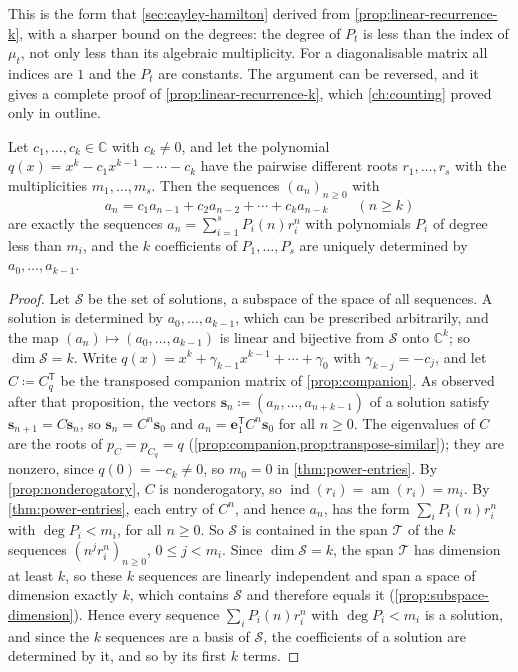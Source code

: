 This is the form that \cref{sec:cayley-hamilton} derived from \cref{prop:linear-recurrence-k}, with a sharper bound on the degrees: the degree of $P_t$ is less than the index of $\mu_t$, not only less than its algebraic multiplicity. For a diagonalisable matrix all indices are $1$ and the $P_t$ are constants. The argument can be reversed, and it gives a complete proof of \cref{prop:linear-recurrence-k}, which \cref{ch:counting} proved only in outline.

\begin{corollary}
\label{cor:linear-recurrence}
Let $c_1,\ldots,c_k\in\mathbb C$ with $c_k\ne0$, and let the polynomial $q(x)=x^k-c_1x^{k-1}-\cdots-c_k$ have the pairwise different roots $r_1,\ldots,r_s$ with the multiplicities $m_1,\ldots,m_s$. Then the sequences $(a_n)_{n\ge0}$ with
\[
a_n=c_1a_{n-1}+c_2a_{n-2}+\cdots+c_ka_{n-k}\qquad(n\ge k)
\]
are exactly the sequences $a_n=\sum_{i=1}^sP_i(n)r_i^n$ with polynomials $P_i$ of degree less than $m_i$, and the $k$ coefficients of $P_1,\ldots,P_s$ are uniquely determined by $a_0,\ldots,a_{k-1}$.
\end{corollary}

\begin{proof}
Let $\mathcal S$ be the set of solutions, a subspace of the space of all sequences. A solution is determined by $a_0,\ldots,a_{k-1}$, which can be prescribed arbitrarily, and the map $(a_n)\mapsto(a_0,\ldots,a_{k-1})$ is linear and bijective from $\mathcal S$ onto $\mathbb C^k$; so $\dim\mathcal S=k$. Write $q(x)=x^k+\gamma_{k-1}x^{k-1}+\cdots+\gamma_0$ with $\gamma_{k-j}=-c_j$, and let $C\coloneqq C_q^{\mathsf T}$ be the transposed companion matrix of \cref{prop:companion}. As observed after that proposition, the vectors $\mathbf s_n\coloneqq(a_n,\ldots,a_{n+k-1})$ of a solution satisfy $\mathbf s_{n+1}=C\mathbf s_n$, so $\mathbf s_n=C^n\mathbf s_0$ and $a_n=\mathbf e_1^{\mathsf T}C^n\mathbf s_0$ for all $n\ge0$. The eigenvalues of $C$ are the roots of $p_C=p_{C_q}=q$ (\cref{prop:companion,prop:transpose-similar}); they are nonzero, since $q(0)=-c_k\ne0$, so $m_0=0$ in \cref{thm:power-entries}. By \cref{prop:nonderogatory}, $C$ is nonderogatory, so $\operatorname{ind}(r_i)=\operatorname{am}(r_i)=m_i$. By \cref{thm:power-entries}, each entry of $C^n$, and hence $a_n$, has the form $\sum_iP_i(n)r_i^n$ with $\deg P_i<m_i$, for all $n\ge0$. So $\mathcal S$ is contained in the span $\mathcal T$ of the $k$ sequences $(n^jr_i^n)_{n\ge0}$, $0\le j<m_i$. Since $\dim\mathcal S=k$, the span $\mathcal T$ has dimension at least $k$, so these $k$ sequences are linearly independent and span a space of dimension exactly $k$, which contains $\mathcal S$ and therefore equals it (\cref{prop:subspace-dimension}). Hence every sequence $\sum_iP_i(n)r_i^n$ with $\deg P_i<m_i$ is a solution, and since the $k$ sequences are a basis of $\mathcal S$, the coefficients of a solution are determined by it, and so by its first $k$ terms.
\end{proof}

